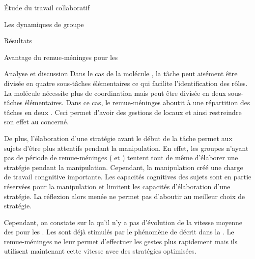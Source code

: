 \documentclass[myfrancais]{mythesis}
\begin{document}
\begin{mypart}{Étude du travail collaboratif}
\begin{mychapter}{Les dynamiques de groupe}
\begin{mysection}{Résultats}
\begin{mysubsection}{Avantage du remue-méninges pour les }
\begin{mysubsubsection}{Analyse et discussion}
						Dans le cas de la molécule \myPrion, la tâche peut aisément être divisée en quatre sous-tâches élémentaires ce qui facilite l'identification des rôles.
						La molécule \myUbiquitin nécessite plus de coordination mais peut être divisée en deux sous-tâches élémentaires.
						Dans ce cas, le remue-méninges aboutit à une répartition des tâches en deux .
						Ceci permet d'avoir des gestions de  locaux et ainsi restreindre son effet au  concerné.

						De plus, l'élaboration d'une stratégie avant le début de la tâche permet aux sujets d'être plus attentifs pendant la manipulation.
						En effet, les groupes n'ayant pas de période de remue-méninges ( et ) tentent tout de même d'élaborer une stratégie pendant la manipulation.
						Cependant, la manipulation créé une charge de travail congnitive importante.
						Les capacités cognitives des sujets sont en partie réservées pour la manipulation et limitent les capacités d'élaboration d'une stratégie.
						La réflexion alors menée ne permet pas d'aboutir au meilleur choix de stratégie.

						Cependant, on constate sur la  qu'il n'y a pas d'évolution de la vitesse moyenne des  pour les .
						Les  sont déjà stimulés par le phénomène de  décrit dans la .
						Le remue-méninges ne leur permet d'effectuer les gestes plus rapidement mais ils utilisent maintenant cette vitesse avec des stratégies optimisées.


\end{mysubsubsection}
\end{mysubsection}
\end{mysection}
\end{mychapter}
\end{mypart}
\end{document}
